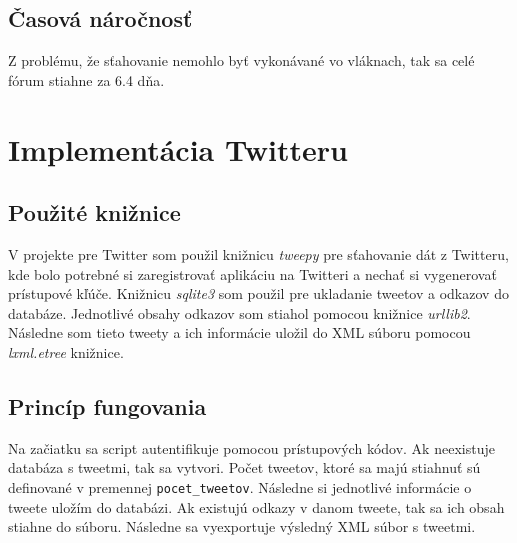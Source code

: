 \documentclass[11pt, a4paper, titlepage] {article}
\begin{document}
\subsection{Časová náročnosť}
Z problému, že sťahovanie nemohlo byť vykonávané vo vláknach, tak sa celé fórum stiahne za 6.4 dňa. 

\newpage
\section{Implementácia Twitteru}
\subsection{Použité knižnice}
V projekte pre Twitter som použil knižnicu \emph{tweepy} pre sťahovanie dát z Twitteru, kde bolo potrebné si zaregistrovať aplikáciu na Twitteri a nechať si vygenerovať prístupové kľúče. Knižnicu \emph{sqlite3} som použil pre ukladanie tweetov a odkazov do databáze. Jednotlivé obsahy odkazov som stiahol pomocou knižnice \emph{urllib2}. Následne som tieto tweety a ich informácie uložil do XML súboru pomocou \emph{lxml.etree} knižnice. 

\subsection{Princíp fungovania}
Na začiatku sa script autentifikuje pomocou prístupových kódov. Ak neexistuje databáza s tweetmi, tak sa vytvori. Počet tweetov, ktoré sa majú   stiahnuť sú definované v premennej \verb|pocet_tweetov|. Následne si jednotlivé informácie o tweete uložím do databázi. Ak existujú odkazy v danom tweete, tak sa ich obsah stiahne do súboru. Následne sa vyexportuje výsledný XML súbor s tweetmi. 
\end{document}
